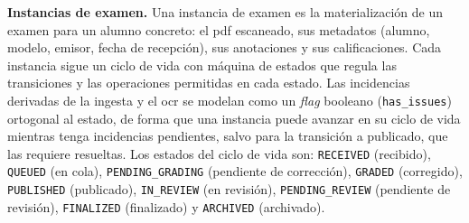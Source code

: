 
\item \textbf{Instancias de examen.} \label{rf:instances}
Una instancia de examen es la materialización de un examen para un alumno concreto: el
\acs{pdf} escaneado, sus metadatos (alumno, modelo, emisor, fecha de recepción), sus
anotaciones y sus calificaciones. Cada instancia sigue un ciclo de vida con máquina de
estados que regula las transiciones y las operaciones permitidas en cada estado. Las
incidencias derivadas de la ingesta y el \acs{ocr} se modelan como un \textit{flag}
booleano (\texttt{has\_issues}) ortogonal al estado, de forma que una instancia puede
avanzar en su ciclo de vida mientras tenga incidencias pendientes, salvo para la
transición a publicado, que las requiere resueltas. Los estados del ciclo de vida son:
\texttt{RECEIVED} (recibido), \texttt{QUEUED} (en cola), \texttt{PENDING\_GRADING}
(pendiente de corrección), \texttt{GRADED} (corregido), \texttt{PUBLISHED} (publicado),
\texttt{IN\_REVIEW} (en revisión), \texttt{PENDING\_REVIEW} (pendiente de revisión),
\texttt{FINALIZED} (finalizado) y \texttt{ARCHIVED} (archivado).

